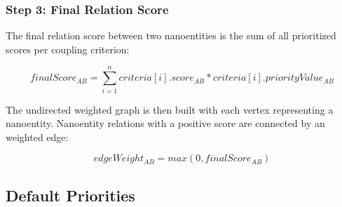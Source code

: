 \subsubsection{Step 3: Final Relation Score}

The final relation score between two nanoentities is the sum of all prioritized scores per coupling criterion: 

\begin{displaymath}
finalScore_{AB} = \sum\limits_{i=1}^n criteria[i].score_{AB} * criteria[i].priorityValue_{AB}
\end{displaymath}

The undirected weighted graph is then built with each vertex representing a nanoentity. Nanoentity relations with a positive score are connected by an weighted edge:

\begin{displaymath}
edgeWeight_{AB} = max(0, finalScore_{AB})	
\end{displaymath}

	
\subsection{Default Priorities}
\label{sec:defaultPriorities}

